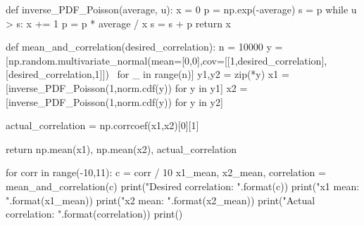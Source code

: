 def inverse_PDF_Poisson(average, u):
    x = 0
    p = np.exp(-average)
    s = p
    while u > s:
        x += 1
        p = p * average / x
        s = s + p
    return x  

def mean_and_correlation(desired_correlation):
    n = 10000
    y = [np.random.multivariate_normal(mean=[0,0],cov=[[1,desired_correlation],[desired_correlation,1]]) \
         for _ in range(n)]
    y1,y2 = zip(*y)
    x1 = [inverse_PDF_Poisson(1,norm.cdf(y)) for y in y1]
    x2 = [inverse_PDF_Poisson(1,norm.cdf(y)) for y in y2]
    
    actual_correlation = np.corrcoef(x1,x2)[0][1]
    
    return np.mean(x1), np.mean(x2), actual_correlation

for corr in range(-10,11):
    c = corr / 10
    x1_mean, x2_mean, correlation = mean_and_correlation(c)
    print("Desired correlation: {}".format(c))
    print("x1 mean: {}".format(x1_mean))
    print("x2 mean: {}".format(x2_mean))
    print("Actual correlation: {}".format(correlation))
    print()
